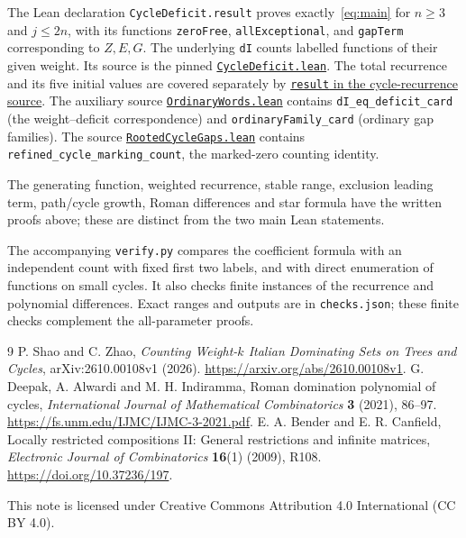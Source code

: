 \documentclass[11pt]{article}
\begin{document}
The Lean declaration \texttt{CycleDeficit.result} proves exactly~\eqref{eq:main} for $n\geq3$
and $j\leq2n$, with its functions \texttt{zeroFree},
\texttt{allExceptional}, and \texttt{gapTerm} corresponding to $Z,E,G$.
The underlying \texttt{dI} counts labelled functions of their given weight.
Its source is the pinned
\href{https://github.com/the-omega-institute/trureturing/blob/7d127fe3daacaa59991ac9a3ed5e2931a1eeadeb/D5/S3/Combinatorics/Graph/ItalianDomination/CycleDeficit.lean}{\texttt{CycleDeficit.lean}}.
The total recurrence and its five initial values are covered separately by
\href{https://github.com/the-omega-institute/trureturing/blob/7d127fe3daacaa59991ac9a3ed5e2931a1eeadeb/D5/S3/Combinatorics/Graph/CycleItalianDominationRecurrence.lean}{\texttt{result} in the cycle-recurrence source}.
The auxiliary source
\href{https://github.com/the-omega-institute/trureturing/blob/7d127fe3daacaa59991ac9a3ed5e2931a1eeadeb/D5/S3/Combinatorics/Graph/ItalianDomination/OrdinaryWords.lean}{\texttt{OrdinaryWords.lean}}
contains \texttt{dI\_eq\_deficit\_card} (the weight--deficit correspondence)
and \texttt{ordinaryFamily\_card} (ordinary gap families).
The source
\href{https://github.com/the-omega-institute/trureturing/blob/7d127fe3daacaa59991ac9a3ed5e2931a1eeadeb/D5/S3/Combinatorics/Graph/ItalianDomination/RootedCycleGaps.lean}{\texttt{RootedCycleGaps.lean}}
contains \texttt{refined\_cycle\_marking\_count}, the marked-zero counting
identity.

The generating function, weighted recurrence, stable range, exclusion leading
term, path/cycle growth, Roman differences and star formula have the written
proofs above; these are distinct from the two main Lean statements.

The accompanying \texttt{verify.py} compares the coefficient formula with
an independent count with fixed first two labels, and with direct enumeration of
functions on small cycles. It also checks finite instances of the recurrence
and polynomial differences. Exact ranges and outputs are in
\texttt{checks.json}; these finite checks complement the all-parameter proofs.

\begin{thebibliography}{9}
 P. Shao and C. Zhao,
\emph{Counting Weight-$k$ Italian Dominating Sets on Trees and Cycles},
arXiv:2610.00108v1 (2026).
\url{https://arxiv.org/abs/2610.00108v1}.
 G. Deepak, A. Alwardi and M. H. Indiramma,
Roman domination polynomial of cycles,
\emph{International Journal of Mathematical Combinatorics}
\textbf{3} (2021), 86--97.
\url{https://fs.unm.edu/IJMC/IJMC-3-2021.pdf}.
 E. A. Bender and E. R. Canfield,
Locally restricted compositions II: General restrictions and infinite matrices,
\emph{Electronic Journal of Combinatorics} \textbf{16}(1) (2009), R108.
\url{https://doi.org/10.37236/197}.
\end{thebibliography}
\bigskip
\noindent\small This note is licensed under Creative Commons Attribution 4.0
International (CC BY 4.0).
\end{document}

